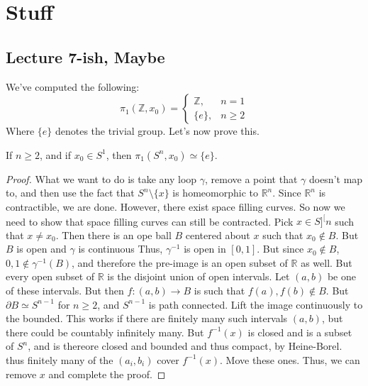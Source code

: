 \chapter{Stuff}
\section{Lecture 7-ish, Maybe}
    We've computed the following:
    \begin{equation}
        \pi_{1}(\mathbb{Z},x_{0})=
        \begin{cases}
            \mathbb{Z},&n=1\\
            \{e\},&n\geq{2}
        \end{cases}
    \end{equation}
    Where $\{e\}$ denotes the trivial group. Let's
    now prove this.
    \begin{theorem}
        If $n\geq{2}$, and if $x_{0}\in{S}^{1}$, then
        $\pi_{1}(S^{n},x_{0})\simeq\{e\}$.
    \end{theorem}
    \begin{proof}
        What we want to do is take any loop $\gamma$,
        remove a point that
        $\gamma$ doesn't map to, and then use the fact
        that $S^{n}\setminus\{x\}$ is homeomorphic to
        $\mathbb{R}^{n}$. Since $\mathbb{R}^{n}$ is
        contractible, we are done. However, there exist
        space filling curves. So now we need to show that
        space filling curves can still be contracted.
        Pick $x\in{S]^[n}$ such that $x\ne{x}_{0}$. Then
        there is an ope ball $B$ centered about $x$ such
        that $x_{0}\notin{B}$. But $B$ is open and
        $\gamma$ is continuous Thus, $\gamma^{\minus{1}}$ is
        open in $[0,1]$. But since $x_{0}\notin{B}$,
        $0,1\notin\gamma^{\minus{1}}(B)$, and therefore
        the pre-image is an open subset of $\mathbb{R}$ as
        well. But every open subset of $\mathbb{R}$ is the
        disjoint union of open intervals. Let
        $(a,b)$ be one of these intervals. But then
        $f:(a,b)\rightarrow{B}$ is such that
        $f(a),f(b)\notin{B}$. But
        $\partial{B}\simeq{S}^{n-1}$ for $n\geq{2}$, and
        $S^{n-1}$ is path connected. Lift the image
        continuously to the bounded. This works if there
        are finitely many such intervals $(a,b)$, but there
        could be countably infinitely many. But
        $f^{\minus{1}}(x)$ is closed and is a subset of
        $S^{n}$, and is thereore closed and bounded and thus
        compact, by Heine-Borel. thus finitely many of the
        $(a_{i},b_{i})$ cover $f^{\minus{1}}(x)$. Move these
        ones. Thus, we can remove $x$ and complete the proof.
    \end{proof}
